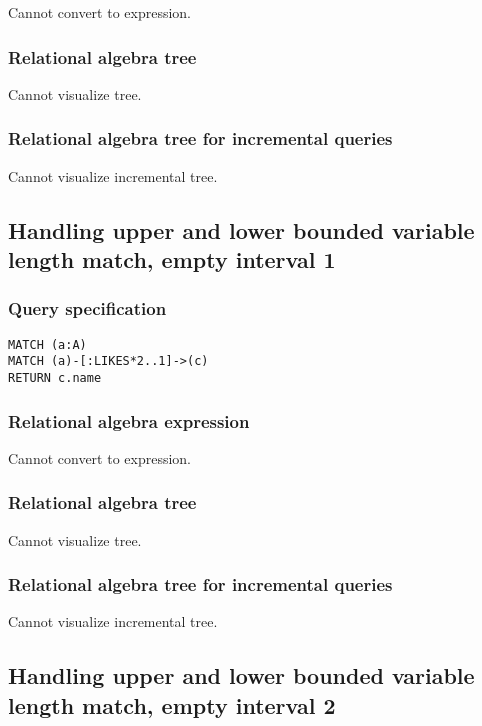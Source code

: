 Cannot convert to expression.

\subsubsection*{Relational algebra tree}

Cannot visualize tree.

\subsubsection*{Relational algebra tree for incremental queries}

Cannot visualize incremental tree.

\subsection{Handling upper and lower bounded variable length match, empty interval 1}

\subsubsection*{Query specification}

\begin{lstlisting}
MATCH (a:A)
MATCH (a)-[:LIKES*2..1]->(c)
RETURN c.name
\end{lstlisting}

\subsubsection*{Relational algebra expression}

Cannot convert to expression.

\subsubsection*{Relational algebra tree}

Cannot visualize tree.

\subsubsection*{Relational algebra tree for incremental queries}

Cannot visualize incremental tree.

\subsection{Handling upper and lower bounded variable length match, empty interval 2}

